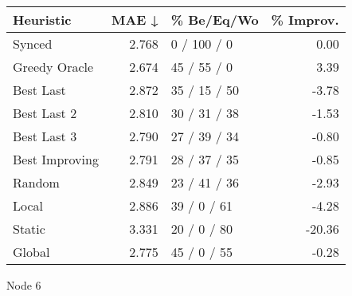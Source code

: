\begin{tabular}{lrlr}
\toprule
\textbf{Heuristic} & \textbf{MAE ↓} & \textbf{\% Be/Eq/Wo} & \textbf{\% Improv.} \\
\midrule
            Synced &          2.768 &          0 / 100 / 0 &                0.00 \\
     Greedy Oracle &          2.674 &          45 / 55 / 0 &                3.39 \\
         Best Last &          2.872 &         35 / 15 / 50 &               -3.78 \\
       Best Last 2 &          2.810 &         30 / 31 / 38 &               -1.53 \\
       Best Last 3 &          2.790 &         27 / 39 / 34 &               -0.80 \\
    Best Improving &          2.791 &         28 / 37 / 35 &               -0.85 \\
            Random &          2.849 &         23 / 41 / 36 &               -2.93 \\
             Local &          2.886 &          39 / 0 / 61 &               -4.28 \\
            Static &          3.331 &          20 / 0 / 80 &              -20.36 \\
            Global &          2.775 &          45 / 0 / 55 &               -0.28 \\
\bottomrule
\end{tabular}
\caption{Node 6}
\label{tab:hr_iid_lr05_le2_bs2_6}
